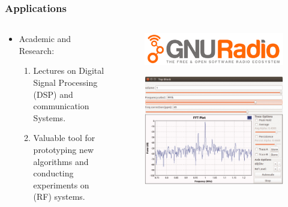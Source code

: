 \begin{frame}
	\frametitle{Applications}
    
\begin{columns}
        \begin{column}{0.5\textwidth}
     \begin{itemize}
    \item Academic and Research:
    \begin{enumerate}
        \item Lectures on Digital Signal Processing (DSP) and communication Systems.
        \item Valuable tool for prototyping new algorithms and conducting experiments on (RF) systems.
    \end{enumerate}
     \end{itemize}
     
        \end{column}
        
        \begin{column}{0.5\textwidth}
            \begin{figure}[]
                \centering
                \includegraphics[width=\linewidth]{img/GNU_radio_logo.png}
                \label{fig:gnu_radio_logo}
            \end{figure}
            \begin{figure}
                \centering
                \includegraphics[width=.7\linewidth]{img/applications/learning.png}
                \label{fig:enter-label}
            \end{figure}
        \end{column}
    \end{columns}
\end{frame}

